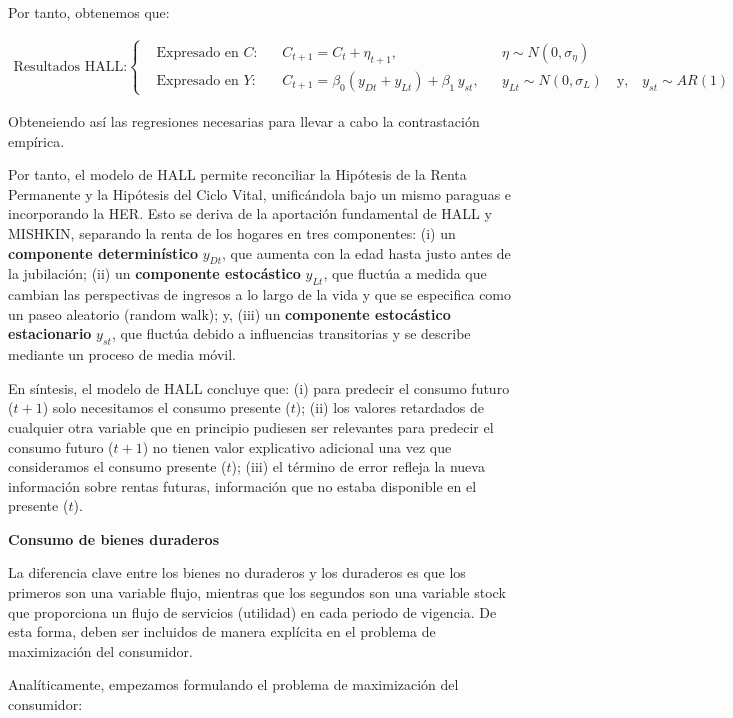 \documentclass[10pt,a4paper]{article}
\begin{document}
Por tanto, obtenemos que:

$\begin{aligned}
  \text{Resultados HALL:}
  \left\{\begin{aligned}
        &\text{Expresado en $C$}:&&C_{t+1}=C_t+\eta_{t+1},&& \eta\sim N(0,\sigma_\eta)\\[0.5em]
        &\text{Expresado en $Y$}:&&C_{t+1}=\beta_0(y_{Dt}+y_{Lt})+\beta_1\,y_{st},&& y_{Lt}\sim N(0,\sigma_L)\quad \text{y,}\quad y_{st}\sim AR(1)
  \end{aligned}\right.
\end{aligned}$

Obteneiendo así las regresiones necesarias para llevar a cabo la contrastación empírica.

Por tanto, el modelo de HALL permite reconciliar la Hipótesis de la Renta Permanente y la Hipótesis del Ciclo Vital, unificándola bajo un mismo paraguas e incorporando la HER. Esto se deriva de la aportación fundamental de HALL y MISHKIN, separando la renta de los hogares en tres componentes: (i) un \textbf{componente determinístico} $y_{Dt}$, que aumenta con la edad hasta justo antes de la jubilación; (ii) un \textbf{componente estocástico} $y_{Lt}$, que fluctúa a medida que cambian las perspectivas de ingresos a lo largo de la vida y que se especifica como un paseo aleatorio (random walk); y, (iii) un \textbf{componente estocástico estacionario} $y_{st}$, que fluctúa debido a influencias transitorias y se describe mediante un proceso de media móvil. 

En síntesis, el modelo de HALL concluye que: (i) para predecir el consumo futuro ($t+1$) solo necesitamos el consumo presente ($t$); (ii) los valores retardados de cualquier otra variable que en principio pudiesen ser relevantes para predecir el consumo futuro ($t+1$) no tienen valor explicativo adicional una vez que consideramos el consumo presente ($t$); (iii) el término de error refleja la nueva información sobre rentas futuras, información que no estaba disponible en el presente ($t$).

\textbf{Consumo de bienes duraderos}

La diferencia clave entre los bienes no duraderos y los duraderos es que los primeros son una variable flujo, mientras que los segundos son una variable stock que proporciona un flujo de servicios (utilidad) en cada periodo de vigencia. De esta forma, deben ser incluidos de manera explícita en el problema de maximización del consumidor. 


Analíticamente, empezamos formulando el problema de maximización del consumidor:
\end{document}
